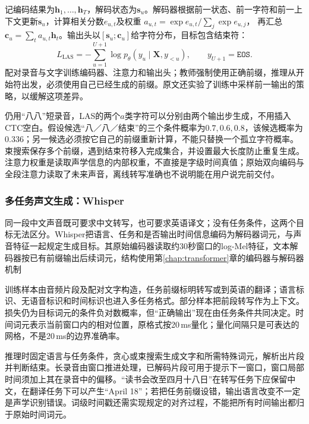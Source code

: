 记编码结果为$\bm{h}_1,\ldots,\bm{h}_T$，解码状态为$\bm{s}_u$。解码器根据前一状态、前一字符和前一上下文更新$\bm{s}_u$，计算相关分数$e_{u,t}$及权重
$a_{u,t}=\exp e_{u,t}/\sum_j\exp e_{u,j}$，
再汇总$\bm{c}_u=\sum_ta_{u,t}\bm{h}_t$。输出头以$[\bm{s}_u;\bm{c}_u]$给字符分布，目标包含结束符：
\begin{equation}
 L_{\mathrm{LAS}}=-\sum_{u=1}^{U+1}
       \log p_\theta(y_u\mid\bm{X},y_{<u}),
 \qquad y_{U+1}=\texttt{EOS}.
 \label{eq:nlp-speech-las}
\end{equation}
配对录音与文字训练编码器、注意力和输出头；教师强制使用正确前缀，推理从开始符出发，必须使用自己已经生成的前缀。原文还实验了训练中采样前一输出的策略，以缓解这项差异。

仍用“八八”短录音，LAS的两个$a$类字符可以分别由两个输出步生成，不用插入CTC空白。假设候选“八／八／结束”的三个条件概率为$0.7,0.6,0.8$，该候选概率为$0.336$；另一候选必须按它自己的前缀重新计算，不能只替换一个孤立字符概率。束搜索保存多个前缀，遇到结束符移入完成集合，并设置最大长度防止重复生成。注意力权重是读取声学信息的内部权重，不直接是字级时间真值；原始双向编码与全段注意力读取了未来声音，离线转写准确也不说明能在用户说完前交付。

\subsubsection{多任务声文生成：Whisper}
\label{sec:nlp-speech-whisper}

同一段中文声音既可要求中文转写，也可要求英语译文；没有任务条件，这两个目标无法区分。Whisper把语言、任务和是否输出时间信息编码为解码器词元，与声音特征一起规定生成目标。其原始编码器读取约30秒窗口的log-Mel特征，文本解码器按已有前缀输出后续词元，结构使用第\ref{chap:transformer}章的编码器与解码器机制

训练样本由音频片段及配对文字构造，任务前缀标明转写或到英语的翻译；语言标识、无语音标识和时间标识也进入多任务格式。部分样本把前段转写作为上下文。损失仍为目标词元的条件负对数概率，但“正确输出”现在由任务条件共同决定。时间词元表示当前窗口内的相对位置，原格式按20\,ms量化；量化间隔只是可表达的网格，不是20\,ms的边界准确率。

推理时固定语言与任务条件，贪心或束搜索生成文字和所需特殊词元，解析出片段并判断结束。长录音由窗口推进处理，已解码片段可用于提示下一窗口，窗口局部时间须加上其在录音中的偏移。“读书会改至四月十八日”在转写任务下应保留中文，在翻译任务下可以产生“April 18”；若把任务前缀设错，输出语言改变不一定是声学识别错误。词级时间戳还需实现规定的对齐过程，不能把所有时间输出都归于原始时间词元。

